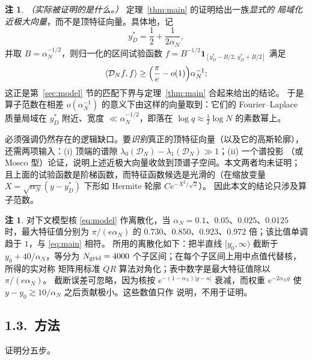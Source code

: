 \documentclass[12pt,a4paper]{amsart}
\numberwithin{equation}{section}
\theoremstyle{plain}
\theoremstyle{definition}
\newtheorem{remark}[theorem]{注}
\begin{document}
\begin{remark}\label{rem:eigenvector}
\emph{（实际被证明的是什么。）} 定理~\ref{thm:main} 的证明给出一族\emph{显式的
局域化近极大向量}，而不是顶特征向量。具体地，记
\begin{equation}\label{eq:peakpoint}
 y_D^*=\frac12+\frac1{2\alpha_N},
\end{equation}
并取 $B=\alpha_N^{-1/2}$，则归一化的区间试验函数
$f=B^{-1/2}\mathbf 1_{[y_D^*-B/2,\,y_D^*+B/2]}$ 满足
\[
 \langle\mathcal D_Nf,f\rangle\ge\Bigl(\frac{\pi}{e}-o(1)\Bigr)\alpha_N^{-1};
\]
这正是第~\ref{sec:model} 节的匹配下界与定理~\ref{thm:main} 合起来给出的结论。
于是算子范数在相差 $o(\alpha_N^{-1})$ 的意义下由这样的向量取到：它们的
Fourier--Laplace 质量局域在 $y_D^*$ 附近、宽度 $\ll\alpha_N^{-1/2}$，即落在
$\log q\approx\frac12\log N$ 的素数幂上。

必须强调仍然存在的逻辑缺口。要\emph{识别}真正的顶特征向量（以及它的高斯轮廓），
还需两项输入：(i) 顶端的谱隙
$\lambda_0(\mathcal D_N)-\lambda_1(\mathcal D_N)\gg1$；(ii) 一个谱投影
（或 Mosco 型）论证，说明上述近极大向量收敛到顶谱子空间。本文两者均未证明；
且上面的试验函数是阶梯函数，而特征函数候选是光滑的（在缩放变量
$X=\sqrt{\alpha_N}(y-y_D^*)$ 下形如 Hermite 轮廓 $Ce^{-X^2/\sqrt2}$）。
因此本文的结论只涉及算子范数。
\end{remark}

\begin{remark}\label{rem:numerical}
对下文模型核 \eqref{eq:model} 作离散化，当
$\alpha_N=0.1$、$0.05$、$0.025$、$0.0125$ 时，最大特征值分别为
$\pi/(e\alpha_N)$ 的 $0.730$、$0.850$、$0.923$、$0.972$ 倍；该比值单调
趋于 $1$，与 \eqref{eq:main} 相符。
所用的离散化如下：把半直线 $[y_0,\infty)$ 截断于 $y_0+40/\alpha_N$，等分为
$N_{\rm grid}=4000$ 个子区间；在每个子区间上用中点值代替核，所得的实对称
矩阵用标准 $QR$ 算法对角化；表中数字是最大特征值除以 $\pi/(e\alpha_N)$。
截断误差可忽略，因为核按 $e^{-(1-\alpha_N)|y-u|}$ 衰减，而权重
$e^{-2\alpha_Ny}$ 使 $y-y_0\gtrsim10/\alpha_N$ 之后贡献极小。这些数值只作
说明，不用于证明。
\end{remark}

\subsection*{1.3.\ 方法}

证明分五步。
\end{document}
